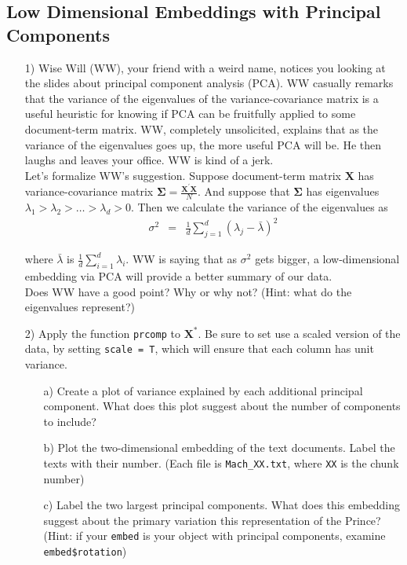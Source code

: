 \documentclass[12pt,letterpaper]{article}
\begin{document}
\subsection*{Low Dimensional Embeddings with Principal Components}

\begin{itemize}
\item[1)]  Wise Will (WW), your friend with a weird name, notices you looking at the slides about principal component analysis (PCA).   WW casually remarks that the variance of the eigenvalues of the variance-covariance matrix is a useful heuristic for knowing if PCA can be fruitfully applied to some document-term matrix.  WW, completely unsolicited, explains that as the variance of the eigenvalues goes up, the more useful PCA will be.  He then laughs and leaves your office.  WW is kind of a jerk.   \\

Let's formalize WW's suggestion. Suppose document-term matrix $\boldsymbol{X}$ has variance-covariance matrix $\boldsymbol{\Sigma} = \frac{\boldsymbol{X}^{'}\boldsymbol{X}}{N}$.  And suppose that $\boldsymbol{\Sigma}$ has eigenvalues $\lambda_{1}>\lambda_{2}>\hdots > \lambda_{d}>0$. Then we calculate the variance of the eigenvalues as 
\begin{eqnarray}
\sigma^{2} & = & \frac{1}{d} \sum_{j=1}^{d}(\lambda_{j} - \bar{\lambda})^{2} \nonumber 
\end{eqnarray}

where $\bar{\lambda}$ is $\frac{1}{d} \sum_{i=1}^{d} \lambda_{i}$. WW is saying that as $\sigma^{2}$ gets bigger, a low-dimensional embedding via PCA will provide a better summary of our data.   \\

Does WW have a good point?  Why or why not? (Hint: what do the eigenvalues represent?)
\item[2)] Apply the function {\tt prcomp} to $\boldsymbol{X}^{*}$. Be sure to set use a scaled version of the data, by setting {\tt scale = T}, which will ensure that each column has unit variance.  
\begin{itemize}
\item[a)] Create a plot of variance explained by each additional principal component. What does this plot suggest about the number of components to include?
\item[b)] Plot the two-dimensional embedding of the text documents.  Label the texts with their number.  (Each file is {\tt Mach\_XX.txt}, where {\tt XX} is the chunk number)
\item[c)] Label the two largest principal components.  What does this embedding suggest about the primary variation this representation of the Prince?  (Hint: if your {\tt embed} is your object with principal components, examine {\tt embed\$rotation})
\end{itemize}



\end{itemize}
\end{document}
